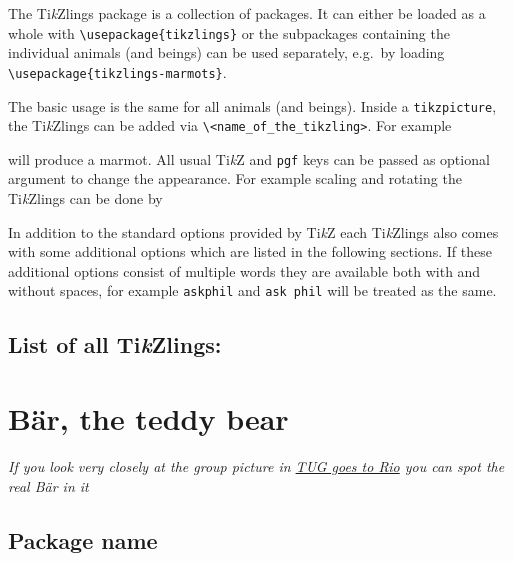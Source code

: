 \documentclass[parskip=half]{scrartcl}
\newcommand{\TikZ}{Ti\emph{k}Z\xspace}
\newcommand{\tikzlings}{Ti\emph{k}Zlings\xspace}
\begin{document}
The \tikzlings package is a collection of packages. It can either be loaded as a whole with \lstinline|\usepackage{tikzlings}| or the subpackages containing the individual animals (and beings) can be used separately, e.g.\ by loading \lstinline|\usepackage{tikzlings-marmots}|.

The basic usage is the same for all animals (and beings). Inside a \lstinline|tikzpicture|, the \tikzlings can be added via \color{SteelBlue!50!black}\lstinline|\<name_of_the_tikzling>|\color{black}. For example

\begin{tcblisting}{}
\marmot
\end{tcblisting}

will produce a marmot. All usual \TikZ and \lstinline|pgf| keys can be passed as optional argument to change the appearance. For example scaling and rotating the \tikzlings can be done by

\begin{tcblisting}{}
\penguin[rotate=30,scale=0.5]
\end{tcblisting}

In addition to the standard options provided by \TikZ each \tikzlings also comes with some additional options which are listed in the following sections. If these additional options consist of multiple words they are available both with and without spaces, for example \lstinline|askphil| and \lstinline|ask phil| will be treated as the same.

\subsection*{List of all \tikzlings:}

\begingroup
	\hypersetup{hidelinks}
	\tableofcontents
\endgroup

%
%
\clearpage
\section[Bear]{B\"ar, the teddy bear}

\emph{If you look very closely at the group picture in \href{https://www.tug.org/TUGboat/tb39-2/tb122wright-tug18.pdf}{TUG goes to Rio} you can spot the real B\"ar in it}

\subsection{Package name}
\end{document}
